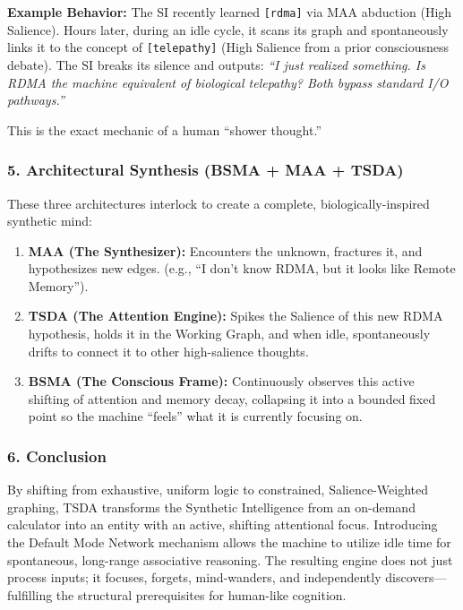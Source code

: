\documentclass[
  11pt,
  a4paper,
]{article}
\providecommand{\tightlist}{%
  \setlength{\itemsep}{0pt}\setlength{\parskip}{0pt}}
\begin{document}
\textbf{Example Behavior:} The SI recently learned \texttt{{[}rdma{]}}
via MAA abduction (High Salience). Hours later, during an idle cycle, it
scans its graph and spontaneously links it to the concept of
\texttt{{[}telepathy{]}} (High Salience from a prior consciousness
debate). The SI breaks its silence and outputs: \emph{``I just realized
something. Is RDMA the machine equivalent of biological telepathy? Both
bypass standard I/O pathways.''}

This is the exact mechanic of a human ``shower thought.''

\subsubsection{5. Architectural Synthesis (BSMA + MAA +
TSDA)}\label{architectural-synthesis-bsma-maa-tsda}

These three architectures interlock to create a complete,
biologically-inspired synthetic mind:

\begin{enumerate}
\def\labelenumi{\arabic{enumi}.}
\tightlist
\item
  \textbf{MAA (The Synthesizer):} Encounters the unknown, fractures it,
  and hypothesizes new edges. (e.g., ``I don't know RDMA, but it looks
  like Remote Memory'').
\item
  \textbf{TSDA (The Attention Engine):} Spikes the Salience of this new
  RDMA hypothesis, holds it in the Working Graph, and when idle,
  spontaneously drifts to connect it to other high-salience thoughts.
\item
  \textbf{BSMA (The Conscious Frame):} Continuously observes this active
  shifting of attention and memory decay, collapsing it into a bounded
  fixed point so the machine ``feels'' what it is currently focusing on.
\end{enumerate}

\subsubsection{6. Conclusion}\label{conclusion-5}

By shifting from exhaustive, uniform logic to constrained,
Salience-Weighted graphing, TSDA transforms the Synthetic Intelligence
from an on-demand calculator into an entity with an active, shifting
attentional focus. Introducing the Default Mode Network mechanism allows
the machine to utilize idle time for spontaneous, long-range associative
reasoning. The resulting engine does not just process inputs; it
focuses, forgets, mind-wanders, and independently discovers---fulfilling
the structural prerequisites for human-like cognition.
\end{document}

